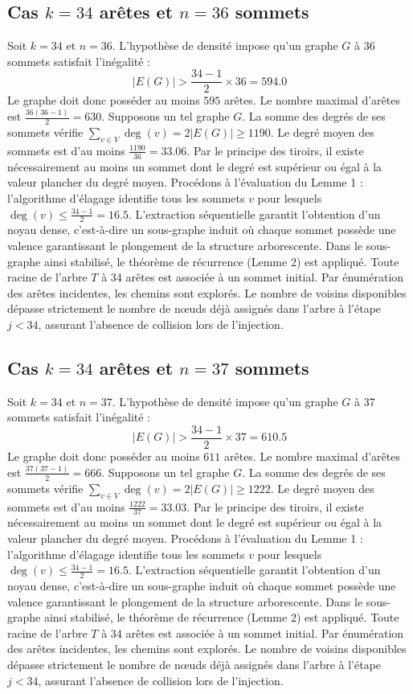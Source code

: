 \documentclass[12pt,a4paper]{article}
\begin{document}
\subsection{Cas $k = 34$ arêtes et $n = 36$ sommets}
Soit $k = 34$ et $n = 36$. L'hypothèse de densité impose qu'un graphe $G$ à 36 sommets satisfait l'inégalité :
$$ |E(G)| > \frac{34-1}{2} \times 36 = 594.0 $$
Le graphe doit donc posséder au moins $595$ arêtes. Le nombre maximal d'arêtes est $\frac{36(36-1)}{2} = 630$.
Supposons un tel graphe $G$. La somme des degrés de ses sommets vérifie $\sum_{v \in V} \deg(v) = 2|E(G)| \geq 1190$.
Le degré moyen des sommets est d'au moins $\frac{1190}{36} = 33.06$.
Par le principe des tiroirs, il existe nécessairement au moins un sommet dont le degré est supérieur ou égal à la valeur plancher du degré moyen.
Procédons à l'évaluation du Lemme 1 : l'algorithme d'élagage identifie tous les sommets $v$ pour lesquels $\deg(v) \leq \frac{34-1}{2} = 16.5$.
L'extraction séquentielle garantit l'obtention d'un noyau dense, c'est-à-dire un sous-graphe induit où chaque sommet possède une valence garantissant le plongement de la structure arborescente.
Dans le sous-graphe ainsi stabilisé, le théorème de récurrence (Lemme 2) est appliqué. Toute racine de l'arbre $T$ à 34 arêtes est associée à un sommet initial. Par énumération des arêtes incidentes, les chemins sont explorés. Le nombre de voisins disponibles dépasse strictement le nombre de nœuds déjà assignés dans l'arbre à l'étape $j < 34$, assurant l'absence de collision lors de l'injection.

\subsection{Cas $k = 34$ arêtes et $n = 37$ sommets}
Soit $k = 34$ et $n = 37$. L'hypothèse de densité impose qu'un graphe $G$ à 37 sommets satisfait l'inégalité :
$$ |E(G)| > \frac{34-1}{2} \times 37 = 610.5 $$
Le graphe doit donc posséder au moins $611$ arêtes. Le nombre maximal d'arêtes est $\frac{37(37-1)}{2} = 666$.
Supposons un tel graphe $G$. La somme des degrés de ses sommets vérifie $\sum_{v \in V} \deg(v) = 2|E(G)| \geq 1222$.
Le degré moyen des sommets est d'au moins $\frac{1222}{37} = 33.03$.
Par le principe des tiroirs, il existe nécessairement au moins un sommet dont le degré est supérieur ou égal à la valeur plancher du degré moyen.
Procédons à l'évaluation du Lemme 1 : l'algorithme d'élagage identifie tous les sommets $v$ pour lesquels $\deg(v) \leq \frac{34-1}{2} = 16.5$.
L'extraction séquentielle garantit l'obtention d'un noyau dense, c'est-à-dire un sous-graphe induit où chaque sommet possède une valence garantissant le plongement de la structure arborescente.
Dans le sous-graphe ainsi stabilisé, le théorème de récurrence (Lemme 2) est appliqué. Toute racine de l'arbre $T$ à 34 arêtes est associée à un sommet initial. Par énumération des arêtes incidentes, les chemins sont explorés. Le nombre de voisins disponibles dépasse strictement le nombre de nœuds déjà assignés dans l'arbre à l'étape $j < 34$, assurant l'absence de collision lors de l'injection.
\end{document}
